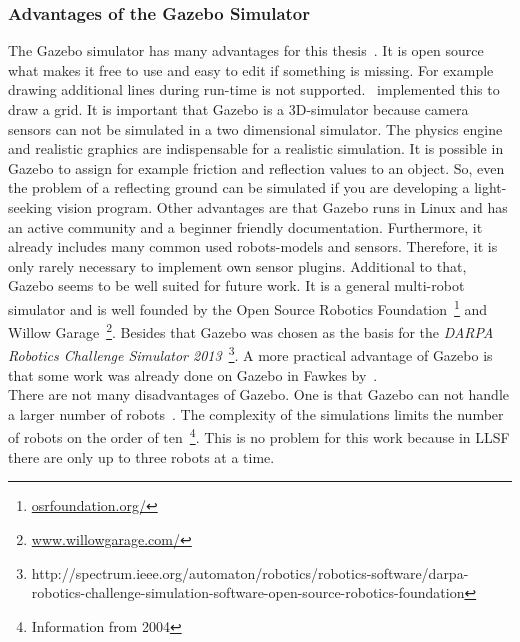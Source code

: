 \documentclass[11pt,a4paper,titlepage]{article}
\begin{document}
\subsubsection{Advantages of the Gazebo Simulator}
The Gazebo simulator has many advantages for this thesis~\cite{GazeboDesign}. It is open source what makes it free to use and easy to edit if something is missing. For example drawing additional lines during run-time is not supported. \cite{KlingenDA}~implemented this to draw a grid. It is important that Gazebo is a 3D-simulator because camera sensors can not be simulated in a two dimensional simulator. The physics engine and realistic graphics are indispensable for a realistic simulation. It is possible in Gazebo to assign for example friction and reflection values to an object. So, even the problem of a reflecting ground can be simulated if you are developing a light-seeking vision program. Other advantages are that Gazebo runs in Linux and has an active community and a beginner friendly documentation. Furthermore, it already includes many common used robots-models and sensors. Therefore, it is only rarely necessary to implement own sensor plugins. Additional to that, Gazebo seems to be well suited for future work. It is a general multi-robot simulator and is well founded by the Open Source Robotics Foundation~\footnote{\url{osrfoundation.org/}} and Willow Garage~\footnote{\url{www.willowgarage.com/}}. Besides that Gazebo was chosen as the basis for the \textit{DARPA Robotics Challenge Simulator 2013}~\footnote{http://spectrum.ieee.org/automaton/robotics/robotics-software/darpa-robotics-challenge-simulation-software-open-source-robotics-foundation}. A more practical advantage of Gazebo is that some work was already done on Gazebo in Fawkes by~\cite{KlingenDA}.\\
There are not many disadvantages of Gazebo. One is that Gazebo can not handle a larger number of robots~\cite{GazeboDesign}. The complexity of the simulations limits the number of robots on the order of ten~\footnote{Information from 2004}. This is no problem for this work because in LLSF there are only up to three robots at a time.
\end{document}
